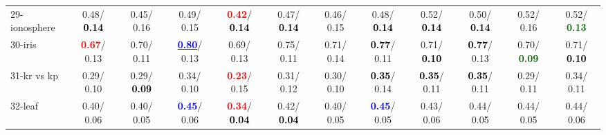 \begin{table}[h]
\begin{center}
{\begin{tabular}{lc|c|c|c|c|c|c|c|c|c|c}
29-ionosphere &   0.48/\textcolor{black}{\textbf{  0.14}} &   0.45/  0.16 &   0.49/  0.15 & \textcolor{red}{\textbf{  0.42}}/\textcolor{black}{\textbf{  0.14}} &   0.47/\textcolor{black}{\textbf{  0.14}} &   0.46/  0.15 &   0.48/\textcolor{black}{\textbf{  0.14}} &   0.52/\textcolor{black}{\textbf{  0.14}} &   0.50/\textcolor{black}{\textbf{  0.14}} &   0.52/  0.16 &   0.52/\textcolor{darkgreen}{\textbf{  0.13}} \\
30-iris & \textcolor{red}{\textbf{  0.67}}/  0.13 &   0.70/  0.11 & \underline{\textcolor{blue}{\textbf{  0.80}}}/  0.13 &   0.69/  0.13 &   0.75/  0.11 &   0.71/  0.14 & \textcolor{black}{\textbf{  0.77}}/  0.11 &   0.71/\textcolor{black}{\textbf{  0.10}} & \textcolor{black}{\textbf{  0.77}}/  0.13 &   0.70/\textcolor{darkgreen}{\textbf{  0.09}} &   0.71/\textcolor{black}{\textbf{  0.10}} \\
31-kr vs kp &   0.29/  0.10 &   0.29/\textcolor{black}{\textbf{  0.09}} &   0.34/  0.10 & \textcolor{red}{\textbf{  0.23}}/  0.15 &   0.31/  0.12 &   0.30/  0.10 & \textcolor{black}{\textbf{  0.35}}/  0.14 & \textcolor{black}{\textbf{  0.35}}/  0.11 & \textcolor{black}{\textbf{  0.35}}/  0.11 &   0.29/  0.11 &   0.34/  0.11 \\
32-leaf &   0.40/  0.06 &   0.40/  0.05 & \textcolor{blue}{\textbf{  0.45}}/  0.06 & \textcolor{red}{\textbf{  0.34}}/\textcolor{black}{\textbf{  0.04}} &   0.42/\textcolor{black}{\textbf{  0.04}} &   0.40/  0.05 & \textcolor{blue}{\textbf{  0.45}}/  0.05 &   0.43/  0.06 &   0.44/  0.05 &   0.44/  0.05 &   0.44/  0.06 \\\end{tabular}}\label{stratsALCKappa0aIELMRedux}
\end{center}
\end{table}
